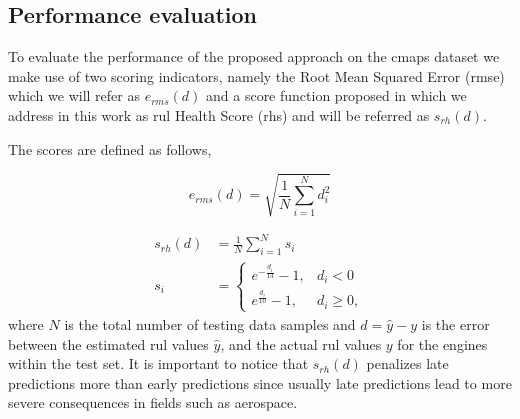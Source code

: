 \subsection{Performance evaluation}
\label{sec:rul_metrics}

To evaluate the performance of the proposed approach on the \gls{cmaps} dataset we make use of two scoring indicators, namely the Root Mean Squared Error (\gls{rmse}) which we will refer as $e_{rms}(d)$ and a score function proposed in \citep{Saxena2008} which we address in this work as \gls{rul} Health Score (\gls{rhs}) and will be referred as $s_{rh}(d)$. 

\pagebreak

The scores are defined as follows,

\begin{equation}
e_{rms}(d) = \sqrt{ \frac{1}{N} \sum_{i=1}^{N}{d_i^2}}
\label{eq:rmse}
\end{equation}

\begin{align}
s_{rh}(d) &= \frac{1}{N} \sum_{i=1}^{N}{s_i} \nonumber \\
s_i &= \begin{cases} 
      e^{-\frac{d_i}{13}} - 1, & d_i < 0 \\
      e^{\frac{d_i}{10}} - 1, & d_i \geq 0,
\end{cases}
\label{eq:rhs}
\end{align}
where $N$ is the total number of testing data samples and $d = \hat{y} - y$ is the error between the estimated \gls{rul} values $\hat{y}$, and the actual \gls{rul} values $y$ for the engines within the test set. It is important to notice that $s_{rh}(d)$ penalizes late predictions more than early predictions since usually late predictions lead to more severe consequences in fields such as aerospace.

